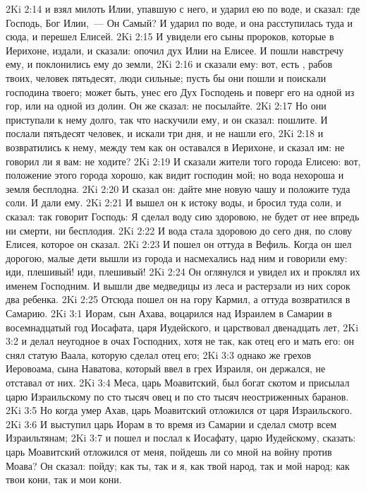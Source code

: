 \vs 2Ki 2:14 и взял милоть Илии, упавшую с него, и ударил ею по воде, и сказал: где Господь, Бог Илии,~--- Он Самый? И ударил по воде, и она расступилась туда и сюда, и перешел Елисей.
\vs 2Ki 2:15 И увидели его сыны пророков, которые в Иерихоне, издали, и сказали: опочил дух Илии на Елисее. И пошли навстречу ему, и поклонились ему до земли,
\vs 2Ki 2:16 и сказали ему: вот, есть , рабов твоих, человек пятьдесят, люди сильные; пусть бы они пошли и поискали господина твоего; может быть, унес его Дух Господень и поверг его на одной из гор, или на одной из долин. Он же сказал: не посылайте.
\vs 2Ki 2:17 Но они приступали к нему долго, так что наскучили ему, и он сказал: пошлите. И послали пятьдесят человек, и искали три дня, и не нашли его,
\vs 2Ki 2:18 и возвратились к нему, между тем как он оставался в Иерихоне, и сказал им: не говорил ли я вам: не ходите?
\vs 2Ki 2:19 И сказали жители того города Елисею: вот, положение этого города хорошо, как видит господин мой; но вода нехороша и земля бесплодна.
\vs 2Ki 2:20 И сказал он: дайте мне новую чашу и положите туда соли. И дали ему.
\vs 2Ki 2:21 И вышел он к истоку воды, и бросил туда соли, и сказал: так говорит Господь: Я сделал воду сию здоровою, не будет от нее впредь ни смерти, ни бесплодия.
\vs 2Ki 2:22 И вода стала здоровою до сего дня, по слову Елисея, которое он сказал.
\vs 2Ki 2:23 И пошел он оттуда в Вефиль. Когда он шел дорогою, малые дети вышли из города и насмехались над ним и говорили ему: иди, плешивый! иди, плешивый!
\vs 2Ki 2:24 Он оглянулся и увидел их и проклял их именем Господним. И вышли две медведицы из леса и растерзали из них сорок два ребенка.
\vs 2Ki 2:25 Отсюда пошел он на гору Кармил, а оттуда возвратился в Самарию.
\vs 2Ki 3:1 Иорам, сын Ахава, воцарился над Израилем в Самарии в восемнадцатый год Иосафата, царя Иудейского, и царствовал двенадцать лет,
\vs 2Ki 3:2 и делал неугодное в очах Господних, хотя не так, как отец его и мать его: он снял статую Ваала, которую сделал отец его;
\vs 2Ki 3:3 однако же грехов Иеровоама, сына Наватова, который ввел в грех Израиля, он держался, не отставал от них.
\rsbpar\vs 2Ki 3:4 Меса, царь Моавитский, был богат скотом и присылал царю Израильскому по сто тысяч овец и по сто тысяч неостриженных баранов.
\vs 2Ki 3:5 Но когда умер Ахав, царь Моавитский отложился от царя Израильского.
\vs 2Ki 3:6 И выступил царь Иорам в то время из Самарии и сделал смотр всем Израильтянам;
\vs 2Ki 3:7 и пошел и послал к Иосафату, царю Иудейскому, сказать: царь Моавитский отложился от меня, пойдешь ли со мной на войну против Моава? Он сказал: пойду; как ты, так и я, как твой народ, так и мой народ; как твои кони, так и мои кони.
